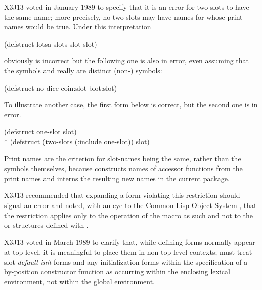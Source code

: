 \begin{defmac}
\begin{new}
X3J13 voted in January 1989
to specify that it is an error for
two slots to have the same name; more precisely, no two slots may
have names for whose print names  would be true.
Under this interpretation
\begin{lisp}
(defstruct lotsa-slots slot slot)
\end{lisp}
obviously is incorrect
but the following one is also in error, even assuming that the symbols
 and  really are distinct (non-) symbols:
\begin{lisp}
(defstruct no-dice coin:slot blot:slot)
\end{lisp}
To illustrate another case, the first  form below is
correct, but the second one is in error.
\begin{lisp}
(defstruct one-slot slot) \\*
(defstruct (two-slots (:include one-slot)) slot)
\end{lisp}

\beforenoterule
\begin{rationale}
Print names are the criterion for slot-names being the same, rather
than the symbols themselves, because  constructs names
of accessor functions from the print names and interns the resulting
new names in the current package.
\end{rationale}
\afternoterule


X3J13 recommended that expanding
a  form violating this
restriction should signal an error and noted, with an eye to the Common Lisp
Object System
, that the restriction applies only to the operation of the
 macro as such and not to the  or
structures defined with .
\end{new}

\begin{newer}
X3J13 voted in March 1989 
to clarify that, while defining forms normally appear at top level,
it is meaningful to place them in non-top-level contexts;
 must treat slot \emph{default-init} forms
and any
initialization forms within the specification of a by-position
constructor function as occurring
within the enclosing lexical environment, not within the global
environment.
\end{newer}


\end{defmac}

